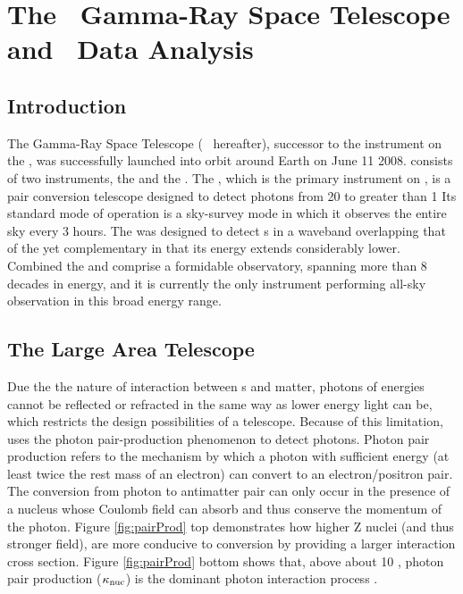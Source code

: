 \chapter{The \Fermi ~Gamma-Ray Space Telescope and \gam ~Data Analysis}
\label{chap:FGST}

\section{\label{FGST:intro}Introduction}
The \Fermi{} Gamma-Ray Space Telescope (\Fermi{} ~hereafter), successor to the \egret{} instrument on the \cgro{}, was successfully launched into orbit around Earth on June 11 2008. \Fermi{} consists of two instruments, the \lat{} and the \gbm{}. The \lat{}, which is the primary instrument on \Fermi{}, is a pair conversion telescope designed to detect photons from 20\mev{} to greater than 1\tev{} \cite{atwood09, lat_perf, 2FHL} Its standard mode of operation is a sky-survey mode in which it observes the entire sky every 3 hours. The \gbm{} was designed to detect \grb{}s in a waveband overlapping that of the \lat{} yet complementary in that its energy extends considerably lower. Combined the \lat{} and \gbm{} comprise a formidable observatory, spanning more than 8 decades in energy, and it is currently the only instrument performing all-sky observation in this broad energy range. 

\section{\label{FGST:LAT}The Large Area Telescope}
Due the the nature of interaction between \gam{}s and matter, photons of \gam{} energies cannot be reflected or refracted in the same way as lower energy light can be, which restricts the design possibilities of a \gam{} telescope. Because of this limitation, \Fermi{} uses the photon pair-production phenomenon to detect \gam{} photons. Photon pair production refers to the mechanism by which a
photon with sufficient energy (at least twice the rest mass of an electron) can convert to an electron/positron pair. The conversion from photon to antimatter pair can only occur in the presence of a nucleus whose Coulomb field can absorb and thus conserve the momentum of the photon. Figure \ref{fig:pairProd} top demonstrates how higher Z nuclei (and thus stronger field), are more conducive to conversion by providing a larger interaction cross section. Figure \ref{fig:pairProd} bottom shows that, above about 10 \mev{}, photon pair production (${\rm \kappa_{nuc}}$) is the dominant photon interaction process \cite{Beringer12}.

